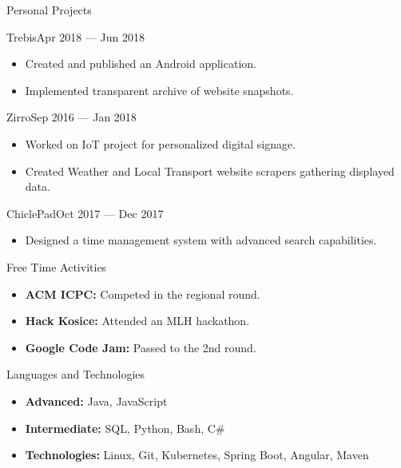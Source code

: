 \documentclass[]{style}
\begin{document}
	\begin{cvsection}{Personal Projects}
	    \begin{cvsubsection}{Trebis}{}{Apr 2018 — Jun 2018}
			\begin{itemize}
				\item Created and published an Android application.
				\item Implemented transparent archive of website snapshots.
			\end{itemize}
		\end{cvsubsection}
		
		\begin{cvsubsection}{Zirro}{}{Sep 2016 — Jan 2018}
			\begin{itemize}
			    \item Worked on IoT project for personalized digital signage.
				\item Created Weather and Local Transport website scrapers gathering displayed data.
			\end{itemize}
		\end{cvsubsection}
		
	    \begin{cvsubsection}{ChiclePad}{}{Oct 2017 — Dec 2017}
			\begin{itemize}
				\item Designed a time management system with advanced search capabilities.
			\end{itemize}
		\end{cvsubsection}
	\end{cvsection}
	
	\begin{cvsection}{Free Time Activities}
		\begin{cvsubsection}{}{}{}	
			\begin{itemize}
                \item \textbf{ACM ICPC:} Competed in the regional round.
                \item \textbf{Hack Kosice:} Attended an MLH hackathon.
				\item \textbf{Google Code Jam:} Passed to the 2nd round.
			\end{itemize}
		\end{cvsubsection}
	\end{cvsection}
	
	\begin{cvsection}{Languages and Technologies}
		\begin{cvsubsection}{}{}{}
			\begin{itemize}
				\item \textbf{Advanced:} Java, JavaScript \item \textbf{Intermediate:} SQL, Python, Bash, C\#
				\item \textbf{Technologies:} Linux, Git, Kubernetes, Spring Boot, Angular, Maven
			\end{itemize}
		\end{cvsubsection}
	\end{cvsection}
	
\end{document}
